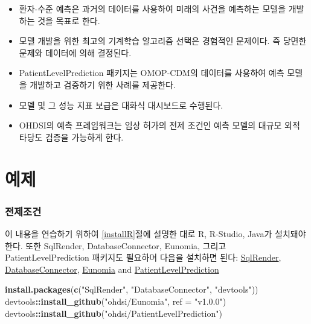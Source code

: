 \documentclass[10.5pt]{book}
\newenvironment{Shaded}{\begin{snugshade}}{\end{snugshade}}
\newcommand{\KeywordTok}[1]{\textcolor[rgb]{0.13,0.29,0.53}{\textbf{#1}}}
\newcommand{\DataTypeTok}[1]{\textcolor[rgb]{0.13,0.29,0.53}{#1}}
\newcommand{\StringTok}[1]{\textcolor[rgb]{0.31,0.60,0.02}{#1}}
\newcommand{\OperatorTok}[1]{\textcolor[rgb]{0.81,0.36,0.00}{\textbf{#1}}}
\newcommand{\NormalTok}[1]{#1}
\theoremstyle{definition}
\theoremstyle{definition}
\theoremstyle{definition}
\theoremstyle{remark}
\let\BeginKnitrBlock\begin \let\EndKnitrBlock\end
\begin{document}
\BeginKnitrBlock{rmdsummary}
\begin{itemize}
\item
  환자-수준 예측은 과거의 데이터를 사용하여 미래의 사건을 예측하는
  모델을 개발하는 것을 목표로 한다.
\item
  모델 개발을 위한 최고의 기계학습 알고리즘 선택은 경험적인 문제이다. 즉
  당면한 문제와 데이터에 의해 결정된다.
\item
  PatientLevelPrediction 패키지는 OMOP-CDM의 데이터를 사용하여 예측
  모델을 개발하고 검증하기 위한 사례를 제공한다.
\item
  모델 및 그 성능 지표 보급은 대화식 대시보드로 수행된다.
\item
  OHDSI의 예측 프레임워크는 임상 허가의 전제 조건인 예측 모델의 대규모
  외적 타당도 검증을 가능하게 한다.
\end{itemize}
\EndKnitrBlock{rmdsummary}

\section{예제}\label{-8}

\subsubsection*{전제조건}\label{-6}

이 내용을 연습하기 위하여 \ref{installR}절에 설명한 대로 R, R-Studio,
Java가 설치돼야 한다. 또한 SqlRender, DatabaseConnector, Eunomia, 그리고
PatientLevelPrediction 패키지도 필요하며 다음을 설치하면 된다:
\href{https://ohdsi.github.io/SqlRender/}{SqlRender},
\href{https://ohdsi.github.io/DatabaseConnector/}{DatabaseConnector},
\href{https://ohdsi.github.io/Eunomia/}{Eunomia} and
\href{https://ohdsi.github.io/PatientLevelPrediction/}{PatientLevelPrediction}

\begin{Shaded}
\begin{Highlighting}[]
\KeywordTok{install.packages}\NormalTok{(}\KeywordTok{c}\NormalTok{(}\StringTok{"SqlRender"}\NormalTok{, }\StringTok{"DatabaseConnector"}\NormalTok{, }\StringTok{"devtools"}\NormalTok{))}
\NormalTok{devtools}\OperatorTok{::}\KeywordTok{install_github}\NormalTok{(}\StringTok{"ohdsi/Eunomia"}\NormalTok{, }\DataTypeTok{ref =} \StringTok{"v1.0.0"}\NormalTok{)}
\NormalTok{devtools}\OperatorTok{::}\KeywordTok{install_github}\NormalTok{(}\StringTok{"ohdsi/PatientLevelPrediction"}\NormalTok{)}
\end{Highlighting}
\end{Shaded}
\end{document}
